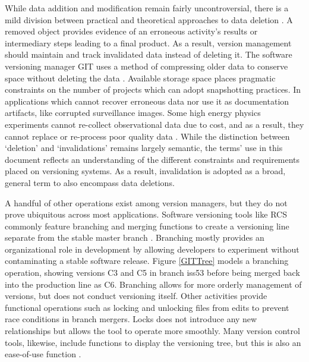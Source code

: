 While data addition and modification remain fairly uncontroversial, there is a mild division between practical and theoretical approaches to data deletion \cite{Flouris04clotho:transparent}.
A removed object provides evidence of an erroneous activity's results or intermediary steps leading to a final product.
As a result, version management should maintain and track invalidated data instead of deleting it.
The software versioning manager GIT uses a method of compressing older data to conserve space without deleting the data \cite{Chacon:2009:PG:1618548}.
Available storage space places pragmatic constraints on the number of projects which can adopt snapshotting practices.
In applications which cannot recover erroneous data nor use it as documentation artifacts, like corrupted surveillance images.
Some high energy physics experiments cannot re-collect observational data due to cost, and as a result, they cannot replace or re-process poor quality data \cite{Cavanaugh2002}.
While the distinction between `deletion' and `invalidations' remains largely semantic, the terms' use in this document reflects an understanding of the different constraints and requirements placed on versioning systems.
As a result, invalidation is adopted as a broad, general term to also encompass data deletions.

A handful of other operations exist among version managers, but they do not prove ubiquitous across most applications.
Software versioning tools like RCS commonly feature branching and merging functions to create a versioning line separate from the stable master branch \cite{tichy1985rcs}.
Branching mostly provides an organizational role in development by allowing developers to experiment without contaminating a stable software release.
Figure \ref{GITTree} models a branching operation, showing versions C3 and C5 in branch iss53 before being merged back into the production line as C6.
Branching allows for more orderly management of versions, but does not conduct versioning itself.
Other activities provide functional operations such as locking and unlocking files from edits to prevent race conditions in branch mergers.
Locks does not introduce any new relationships but allows the tool to operate more smoothly.
Many version control tools, likewise, include functions to display the versioning tree, but this is also an ease-of-use function \cite{Dijkstra1994}.

